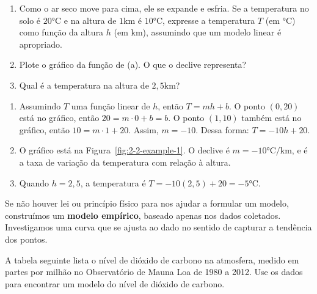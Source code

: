 \begin{enumerate}[label=(\alph*)]
  \item Como o ar seco move para cima, ele se expande e esfria. Se a temperatura no solo é $20\si\degreeCelsius$ e na altura de $1\si\km$ é $10\si\degreeCelsius$, expresse a temperatura $T$ (em $\si\degreeCelsius$) como função da altura $h$ (em $\si\km$), assumindo que um modelo linear é apropriado.
  \item Plote o gráfico da função de (a). O que o declive representa?
  \item Qual é a temperatura na altura de $2,5\si\km$?
\end{enumerate}
\solution
\begin{enumerate}[label=(\alph*)]
  \item Assumindo $T$ uma função linear de $h$, então $T=mh+b$. O ponto $(0,20)$ está no gráfico, então $20=m\cdot 0 + b = b$. O ponto $(1,10)$ também está no gráfico, então $10=m\cdot 1 + 20$. Assim, $m=-10$. Dessa forma: $T=-10h+20$.
  \item O gráfico está na Figura~\ref{fig:2-2-example-1}. O declive é $m=-10\si\degreeCelsius/\si\km$, e é a taxa de variação da temperatura com relação à altura.
  \item Quando $h=2,5$, a temperatura é $T=-10(2,5)+20=-5\si\degreeCelsius$.
  
\end{enumerate}
\exampleEnd
Se não houver lei ou princípio físico para nos ajudar a formular um modelo, construímos um \textbf{modelo empírico}, baseado apenas nos dados coletados. Investigamos uma curva que se ajusta ao dado no sentido de capturar a tendência dos pontos.

 A tabela seguinte lista o nível de dióxido de carbono na atmosfera, medido em partes por milhão no Observatório de Mauna Loa de 1980 a 2012. Use os dados para encontrar um modelo do nível de dióxido de carbono.
\vspace{-0.3cm}\begin{figure}[!ht]
  \centering
  \caption{}\vspace{-0.5cm}
\end{figure}

